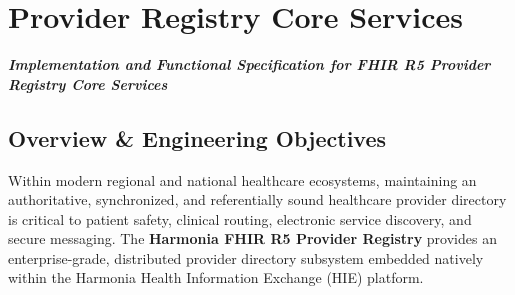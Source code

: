 
\chapter{Provider Registry Core Services}
\label{app:provider_registry}
{\textit{\textbf{Implementation and Functional Specification for FHIR R5 Provider Registry Core Services}}}

\section{Overview \& Engineering Objectives}
\label{sec:pr_guide_overview}

Within modern regional and national healthcare ecosystems, maintaining an authoritative, synchronized, and referentially sound healthcare provider directory is critical to patient safety, clinical routing, electronic service discovery, and secure messaging. The \textbf{Harmonia FHIR R5 Provider Registry} provides an enterprise-grade, distributed provider directory subsystem embedded natively within the Harmonia Health Information Exchange (HIE) platform.

